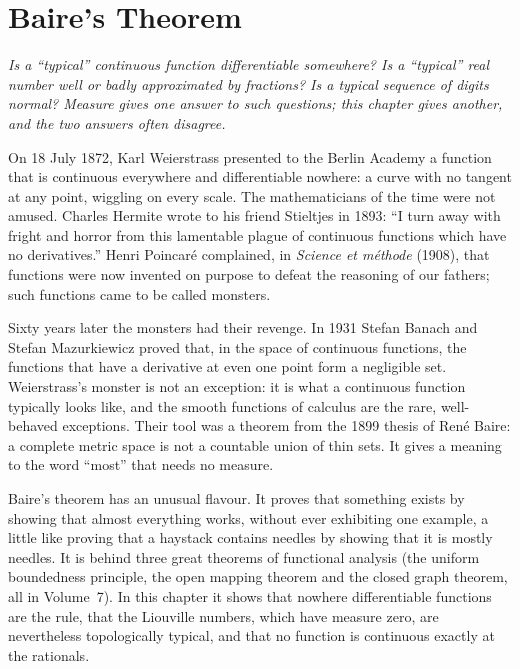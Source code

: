 \chapter{Baire's Theorem}

\begin{center}\itshape
Is a ``typical'' continuous function differentiable somewhere? Is a ``typical'' real number well or badly approximated by
fractions? Is a typical sequence of digits normal? Measure gives one answer to such questions; this chapter gives
another, and the two answers often disagree.
\end{center}

On 18 July 1872, Karl Weierstrass presented to the Berlin Academy a function that is continuous everywhere and
differentiable nowhere: a curve with no tangent at any point, wiggling on every scale. The mathematicians of the time
were not amused. Charles Hermite wrote to his friend Stieltjes in 1893: ``I turn away with fright and horror from this
lamentable plague of continuous functions which have no derivatives.'' Henri Poincar\'e complained, in \emph{Science et m\'ethode} (1908), that functions
were now invented on purpose to defeat the reasoning of our fathers; such functions came to be called monsters.

Sixty years later the monsters had their revenge. In 1931 Stefan Banach and Stefan Mazurkiewicz proved that, in the space
of continuous functions, the functions that have a derivative at even one point form a negligible set. Weierstrass's
monster is not an exception: it is what a continuous function typically looks like, and the smooth functions of calculus
are the rare, well-behaved exceptions. Their tool was a theorem from the 1899 thesis of Ren\'e Baire: a complete metric space
is not a countable union of thin sets. It gives a meaning to the word ``most'' that needs no measure.

Baire's theorem has an unusual flavour. It proves that something exists by showing that almost everything works, without
ever exhibiting one example, a little like proving that a haystack contains needles by showing that it is mostly needles. It
is behind three great theorems of functional analysis (the uniform boundedness principle, the open mapping theorem and the
closed graph theorem, all in Volume~7). In this chapter it shows that nowhere differentiable functions are the rule, that the
Liouville numbers, which have measure zero, are nevertheless topologically typical, and that no function is continuous
exactly at the rationals.

